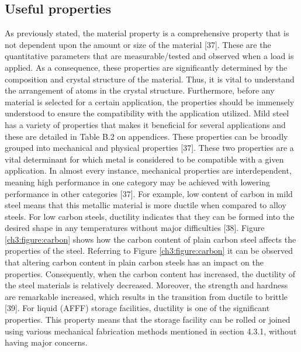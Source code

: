 \documentclass[12pt]{report}
\begin{document}
\subsection{Useful properties} 
As previously stated, the material property is a comprehensive property that is not dependent upon the amount or size of the material [37]. These are the quantitative parameters that are measurable/tested and observed when a load is applied. As a consequence, these properties are significantly determined by the composition and crystal structure of the material. Thus, it is vital to understand the arrangement of atoms in the crystal structure. Furthermore, before any material is selected for a certain application, the properties should be immensely understood to ensure the compatibility with the application utilized.
Mild steel has a variety of properties that makes it beneficial for several applications and these are detailed in Table B.2 on appendices. These properties can be broadly grouped into mechanical and physical properties [37]. These two properties are a vital determinant for which metal is considered to be compatible with a given application. In almost every instance, mechanical properties are interdependent, meaning high performance in one category may be achieved with lowering performance in other categories [37]. For example, low content of carbon in mild steel means that this metallic material is more ductile when compared to alloy steels. 
For low carbon steels, ductility indicates that they can be formed into the desired shape in any temperatures without major difficulties [38]. Figure \ref{ch3:figure:carbon} shows how the carbon content of plain carbon steel affects the properties of the steel. Referring to Figure \ref{ch3:figure:carbon} it can be observed that altering carbon content in plain carbon steels has an impact on the properties. Consequently, when the carbon content has increased, the ductility of the steel materials is relatively decreased. Moreover, the strength and hardness are remarkable increased, which results in the transition from ductile to brittle [39]. For liquid (AFFF) storage facilities, ductility is one of the significant properties. This property means that the storage facility can be rolled or joined using various mechanical fabrication methods mentioned in section 4.3.1, without having major concerns.
 
\end{document}
